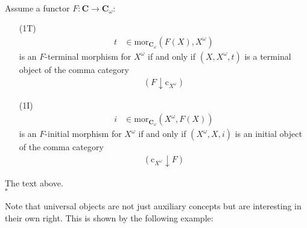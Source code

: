 \\
\begin{thm}
\label{thm:unimorequivuni}
Assume a functor $F \colon \mathbf{C} \rightarrow \mathbf{C}_{\omega}$:
\begin{enumerate}
\item[(1T)]
\begin{align*}
  t
  &\in
  \mathrm{mor}_{\mathbf{C}_{\omega}}(F(X),X^{\omega})
\end{align*}
is an $F$-terminal morphism for $X^{\omega}$ if and only if $(X,X^{\omega},t)$ is a terminal object of the comma category
\begin{align*}
  \left(
    F
    \downarrow
    \mathrm{c}_{X^{\omega}}
  \right)
\end{align*}
\item[(1I)]
\begin{align*}
  i
  &\in
  \mathrm{mor}_{\mathbf{C}_{\omega}}(X^{\omega},F(X))
\end{align*}
is an $F$-initial morphism for $X^{\omega}$ if and only if $(X^{\omega},X,i)$ is an initial object of the comma category
\begin{align*}
  \left(
    \mathrm{c}_{X^{\omega}}
    \downarrow
    F
  \right)
\end{align*}
\end{enumerate}
\end{thm}
\begin{prf}
The text above.
\\
\phantom{proven}
\hfill
$\square$
\end{prf}
Note that universal objects are not just auxiliary concepts but are interesting in their own right. This is shown by the following example:
\\
